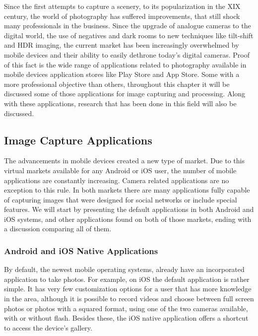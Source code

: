 Since the first attempts to capture a scenery, to its popularization in the XIX century, the world of photography has suffered improvements, that still shock many professionals in the business. Since the upgrade of analogue cameras to the digital world, the use of negatives and dark rooms to new techniques like tilt-shift and HDR imaging, the current market has been increasingly overwhelmed by mobile devices and their ability to easily dethrone today's digital cameras. Proof of this fact is the wide range of applications related to photography available in mobile devices application stores like Play Store and App Store. Some with a more professional objective than others, throughout this chapter it will be discussed some of those applications for image capturing and processing. Along with these applications, research that has been done in this field will also be discussed.

\subsection{Image Capture Applications}

The advancements in mobile devices created a new type of market. Due to this virtual markets available for any Android or iOS user, the number of mobile applications are constantly increasing. Camera related applications are no exception to this rule. In both markets there are many applications fully capable of capturing images that were designed for social networks or include special features. We will start by presenting the default applications in both Android and iOS systems, and other applications found on both of those markets, ending with a discussion comparing all of them.

\subsubsection{Android and iOS Native Applications}

By default, the newest mobile operating systems, already have an incorporated application to take photos. For example, on iOS the default application is rather simple. It has very few customization options for a user that has more knowledge in the area, although it is possible to record videos and choose between full screen photos or photos with a squared format, using one of the two cameras available, with or without flash. Besides these, the iOS native application offers a shortcut to access the device's gallery.

